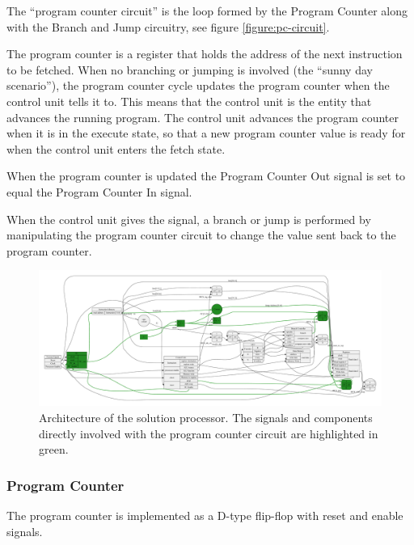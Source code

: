 The ``program counter circuit'' is the loop formed by the Program Counter along with the Branch and Jump circuitry, see figure \vref{figure:pc-circuit}.

The program counter is a register that holds the address of the next instruction to be fetched.
When no branching or jumping is involved (the ``sunny day scenario''), the program counter cycle updates the program counter when the control unit tells it to.
This means that the control unit is the entity that advances the running program.
The control unit advances the program counter when it is in the execute state, so that a new program counter value is ready for when the control unit enters the fetch state.

When the program counter is updated the Program Counter Out signal is set to equal the Program Counter In signal.

When the control unit gives the signal, a branch or jump is performed by manipulating the program counter circuit to change the value sent back to the program counter.

\begin{figure}[h!]
	\begin{center}
		\includegraphics[keepaspectratio, height=\textheight, width=\textwidth]{graphics/cpu-architecture/cpu-arc-pc-circuit.pdf}
		\caption{Architecture of the solution processor. The signals and components directly involved with the program counter circuit are highlighted in green.}
		\label{figure:pc-circuit}
	\end{center}
\end{figure}


\subsubsection{Program Counter}

The program counter is implemented as a D-type flip-flop with reset and enable signals.


